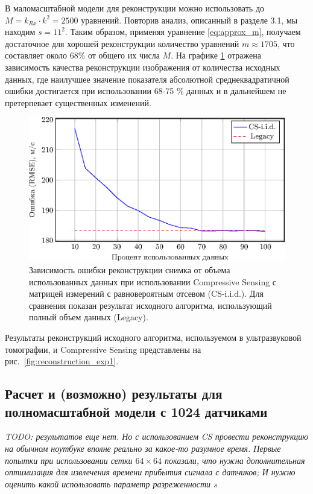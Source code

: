 \documentclass[14pt]{matmex-diploma}
\begin{document}
В маломасштабной модели для реконструкции можно использовать до $M = k_{Rx} \cdot k^2 = 2500$ уравнений. Повторив анализ, описанный в разделе 3.1,
мы находим $s=11^2$.
Таким образом, применяя уравнение \eqref{eq:approx_m}, получаем достаточное для хорошей реконструкции количество уравнений $m \approx 1705$, что составляет около 68\% от общего их числа $M$. На графике \ref{fig:used_equations} отражена зависимость качества реконструкции изображения от количества исходных данных, где наилучшее значение показателя абсолютной среднеквадратичной ошибки  достигается при использовании 68-75 \% данных и в дальнейшем не претерпевает существенных изменений.

\begin{figure}[h]
    \centering
    \includegraphics[width=0.8\linewidth]{pics_eps/rmse_seq.eps}
    \caption{\small Зависимость ошибки реконструкции снимка от объема использованных данных при использовании Compressive Sensing с матрицей измерений с равновероятным отсевом (CS-i.i.d.). Для сравнения показан результат исходного алгоритма, использующий полный объем данных (Legacy).}
    \label{fig:used_equations}
\end{figure}


Результаты реконструкций исходного алгоритма, используемом в ультразвуковой томографии, и Compressive Sensing представлены на рис.~\ref{fig:reconstruction_exp1}.




\subsection{Расчет и (возможно) результаты для полномасштабной модели с 1024 датчиками}
\textit{TODO: результатов еще нет. Но с использованием CS провести реконструкцию на обычном ноутбуке вполне реально за какое-то разумное время. Первые попытки при использовании сетки $64\times 64$ показали, что нужна дополнительная оптимизация для извлечения времени прибытия сигнала с датчиков; И нужно оценить какой использовать параметр разреженности s}\\
\end{document}
